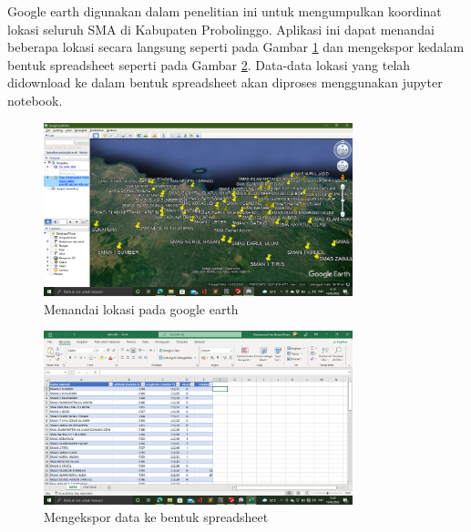 \begin{enumerate}
	Google earth digunakan dalam penelitian ini untuk mengumpulkan koordinat lokasi seluruh SMA di Kabupaten Probolinggo. Aplikasi ini dapat menandai beberapa lokasi secara langsung seperti pada Gambar \ref{fig:markloc} dan mengekspor kedalam bentuk spreadsheet seperti pada Gambar \ref{fig:eksspread}. Data-data lokasi yang telah didownload ke dalam bentuk spreadsheet akan diproses menggunakan jupyter notebook.

\begin{figure}[h!]
  \centering
  \includegraphics[width=0.8\textwidth]{google earth.png}
  \caption{Menandai lokasi pada google earth}
  \label{fig:markloc}
\end{figure}

\begin{figure}[h!]
  \centering
  \includegraphics[width=0.8\textwidth]{ekspor spreadsheet.png}
  \caption{Mengekspor data ke bentuk spreadsheet}
  \label{fig:eksspread}
\end{figure}

\end{enumerate}

